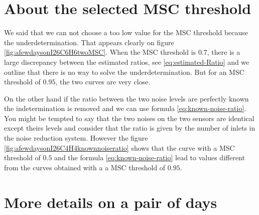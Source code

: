 \newpage\clearpage
\section{About the selected MSC threshold}
We said that we can not choose a too low value for the MSC threshold because the underdetermination. That appears clearly on figure \ref{fig:afewdaysonI26C6H6twoMSC}.
When the  MSC threshold is $0.7$, there is a large discrepancy between the estimated ratios, see \eqref{eq:estimated-Ratio} and we outline that there is no way to solve the underdetermination. But for an MSC threshold of $0.95$, the two curves are very close.


On the other hand if the ratio between the two noise levels are perfectly known the indetermination is removed and we can use formula \eqref{eq:known-noise-ratio}. You might be tempted to say that the two noises on the two sensors are identical except theirs levels and consider that the ratio is given by the number of inlets in the noise reduction system. However the figure \ref{fig:afewdaysonI26C4H4knownnoiseratio} shows that the curve with a MSC threshold of $0.5$ and the formula \eqref{eq:known-noise-ratio} lead to values different from the curves obtained with a a MSC threshold of $0.95$.





\newpage\clearpage
\section{More details on a pair of days}




